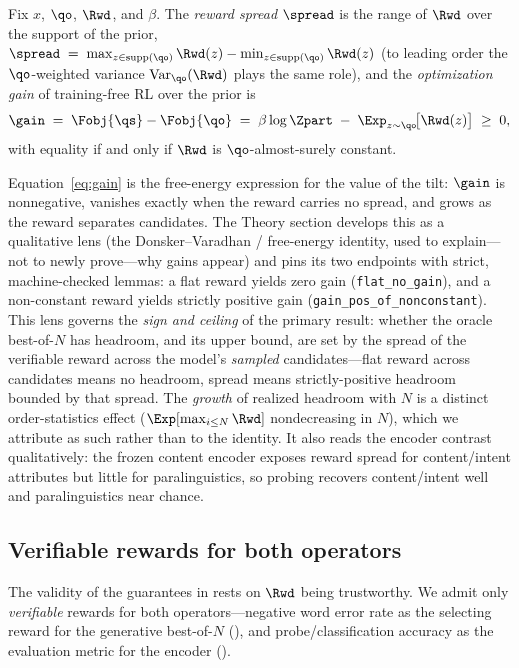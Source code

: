\begin{definition}
\label{def:spread}
Fix $x$, $\qo$, $\Rwd$, and $\beta$. The \emph{reward spread} $\spread$ is the range of $\Rwd$ over the support of the prior, $\spread \;=\; \max_{z\in\operatorname{supp}(\qo)}\Rwd(z)-\min_{z\in\operatorname{supp}(\qo)}\Rwd(z)$ (to leading order the $\qo$-weighted variance $\operatorname{Var}_{\qo}(\Rwd)$ plays the same role), and the \emph{optimization gain} of training-free RL over the prior is
\begin{equation}
\label{eq:gain}
\gain \;=\; \Fobj{\qs} - \Fobj{\qo} \;=\; \beta\log\Zpart \;-\; \Exp_{z\sim\qo}\!\big[\Rwd(z)\big] \;\ge\; 0,
\end{equation}
with equality if and only if $\Rwd$ is $\qo$-almost-surely constant.
\end{definition}

Equation~\eqref{eq:gain} is the free-energy expression for the value of the tilt: $\gain$ is nonnegative, vanishes exactly when the reward carries no spread, and grows as the reward separates candidates. The Theory section develops this as a qualitative lens (the Donsker--Varadhan / free-energy identity, used to explain---not to newly prove---why gains appear) and pins its two endpoints with strict, machine-checked lemmas: a flat reward yields zero gain (\texttt{flat\_no\_gain}), and a non-constant reward yields strictly positive gain (\texttt{gain\_pos\_of\_nonconstant}). This lens governs the \emph{sign and ceiling} of the primary result: whether the oracle best-of-$N$ has headroom, and its upper bound, are set by the spread of the verifiable reward across the model's \emph{sampled} candidates---flat reward across candidates means no headroom, spread means strictly-positive headroom bounded by that spread. The \emph{growth} of realized headroom with $N$ is a distinct order-statistics effect ($\Exp[\max_{i\le N}\Rwd]$ nondecreasing in $N$), which we attribute as such rather than to the identity. It also reads the encoder contrast qualitatively: the frozen content encoder exposes reward spread for content/intent attributes but little for paralinguistics, so probing recovers content/intent well and paralinguistics near chance.

\subsection{Verifiable rewards for both operators}
\label{subsec:reward}

The validity of the guarantees in  rests on $\Rwd$ being trustworthy. We admit only \emph{verifiable} rewards for both operators---negative word error rate as the selecting reward for the generative best-of-$N$ (), and probe/classification accuracy as the evaluation metric for the encoder ().

